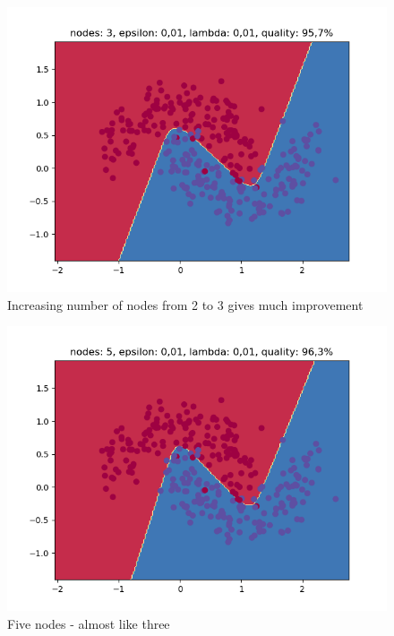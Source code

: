 \documentclass[3p,twocolumn]{elsarticle}
\begin{document}
\begin{figure}[h]
\label{fig:fig5}
  \includegraphics[width=\linewidth]{wykresy/7.png}
	\caption{ Increasing number of nodes from 2 to 3 gives much improvement}
	\label{fig5}
\end{figure}

\begin{figure}[h]
\label{fig:fig5}
  \includegraphics[width=\linewidth]{wykresy/13.png}
	\caption{ Five nodes - almost like three}
	\label{fig5}
\end{figure}
\end{document}
